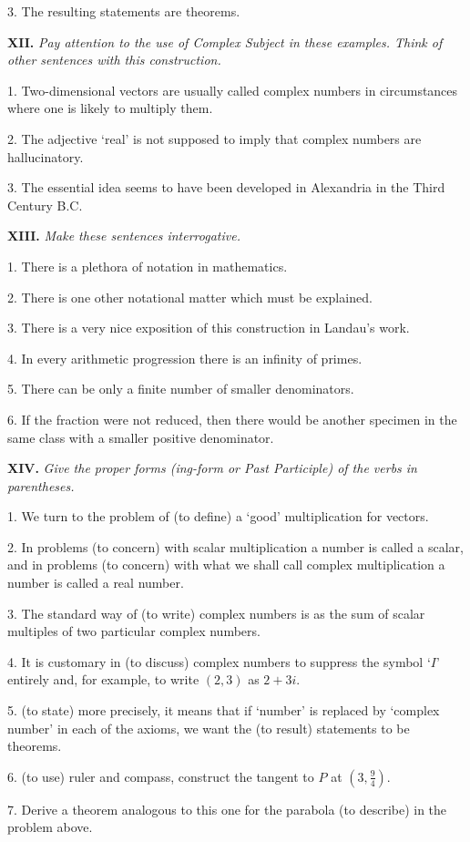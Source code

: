 \documentclass[a4paper]{article}
\newcommand{\ETask}[2]{\medskip\par\textbf{#1.} \textit{#2}\par}
\begin{document}
3. The resulting statements are theorems.

\ETask{XII}{Pay attention to the use of Complex Subject in these examples. Think of other sentences with this construction.}
1. Two-dimensional vectors are usually called complex numbers in circumstances where one is likely to multiply them.

2. The adjective `real' is not supposed to imply that complex numbers are hallucinatory.

3. The essential idea seems to have been developed in Alexandria in the Third Century B.C.

\ETask{XIII}{Make these sentences interrogative.}

1. There is a plethora of notation in mathematics.

2. There is one other notational matter which must be explained.

3. There is a very nice exposition of this construction in Landau's work.

4. In every arithmetic progression there is an infinity of primes.

5. There can be only a finite number of smaller denominators.

6. If the fraction were not reduced, then there would be another specimen in the same class with a smaller positive denominator.

\ETask{XIV}{Give the proper forms (ing-form or Past Participle) of the verbs in parentheses.}

1. We turn to the problem of (to define) a `good' multiplication for vectors.

2. In problems (to concern) with scalar multiplication a number is called a scalar, and in problems (to concern) with what
we shall call complex multiplication a number is called a real number.

3. The standard way of (to write) complex numbers is as the sum of scalar multiples of two particular complex numbers.

4. It is customary in (to discuss) complex numbers to suppress the symbol `$I$' entirely and, for example, to write $(2,3)$ as $2+3i$.

5. (to state) more precisely, it means that if `number' is replaced by `complex number' in each of the axioms, we want the
(to result) statements to be theorems.

6. (to use) ruler and compass, construct the tangent to $P$ at $(3, \frac{9}{4})$.

7. Derive a theorem analogous to this one for the parabola (to describe) in the problem above.
\end{document}
